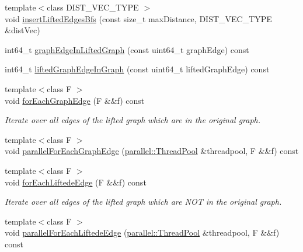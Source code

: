 \begin{DoxyCompactItemize}
\item 
{\footnotesize template$<$class D\+I\+S\+T\+\_\+\+V\+E\+C\+\_\+\+T\+Y\+P\+E $>$ }\\void \hyperlink{classnifty_1_1graph_1_1lifted__multicut_1_1LiftedMulticutObjective_ab4f42405faaa15bddd32cdb77b442b7d}{insert\+Lifted\+Edges\+Bfs} (const size\+\_\+t max\+Distance, D\+I\+S\+T\+\_\+\+V\+E\+C\+\_\+\+T\+Y\+P\+E \&dist\+Vec)
\item 
int64\+\_\+t \hyperlink{classnifty_1_1graph_1_1lifted__multicut_1_1LiftedMulticutObjective_aa4b5b447fcff7766b8241018c1e9293a}{graph\+Edge\+In\+Lifted\+Graph} (const uint64\+\_\+t graph\+Edge) const 
\item 
int64\+\_\+t \hyperlink{classnifty_1_1graph_1_1lifted__multicut_1_1LiftedMulticutObjective_afd16369d5bb5512d433e56a3b4ae74e1}{lifted\+Graph\+Edge\+In\+Graph} (const uint64\+\_\+t lifted\+Graph\+Edge) const 
\item 
{\footnotesize template$<$class F $>$ }\\void \hyperlink{classnifty_1_1graph_1_1lifted__multicut_1_1LiftedMulticutObjective_a768f876248381f2dc4f97508e0bfa29a}{for\+Each\+Graph\+Edge} (F \&\&f) const 
\begin{DoxyCompactList}\small\item\em Iterate over all edges of the lifted graph which are in the original graph. \end{DoxyCompactList}\item 
{\footnotesize template$<$class F $>$ }\\void \hyperlink{classnifty_1_1graph_1_1lifted__multicut_1_1LiftedMulticutObjective_aaae3347259d681c3f2a30cd5410f0f2b}{parallel\+For\+Each\+Graph\+Edge} (\hyperlink{classnifty_1_1parallel_1_1ThreadPool}{parallel\+::\+Thread\+Pool} \&threadpool, F \&\&f) const 
\item 
{\footnotesize template$<$class F $>$ }\\void \hyperlink{classnifty_1_1graph_1_1lifted__multicut_1_1LiftedMulticutObjective_a4e8e1c9fb7a1359d259c19beb187ada4}{for\+Each\+Liftede\+Edge} (F \&\&f) const 
\begin{DoxyCompactList}\small\item\em Iterate over all edges of the lifted graph which are N\+O\+T in the original graph. \end{DoxyCompactList}\item 
{\footnotesize template$<$class F $>$ }\\void \hyperlink{classnifty_1_1graph_1_1lifted__multicut_1_1LiftedMulticutObjective_ae71bd2b228bef6bcfc9b4294e42c4aca}{parallel\+For\+Each\+Liftede\+Edge} (\hyperlink{classnifty_1_1parallel_1_1ThreadPool}{parallel\+::\+Thread\+Pool} \&threadpool, F \&\&f) const 
\end{DoxyCompactItemize}
